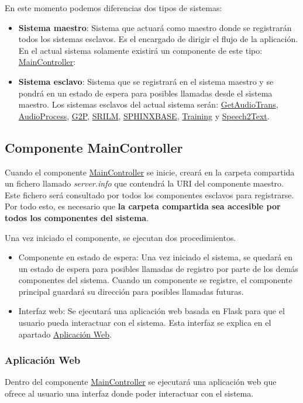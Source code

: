 \documentclass[../main.tex]{subfiles}
\begin{document}
En este momento podemos diferencias dos tipos de sistemas:
\begin{itemize}
    \item \textbf{Sistema maestro}: Sistema que actuará como maestro donde se registrarán todos los sistemas esclavos. Es el encargado de dirigir el flujo de la aplicación. En el actual sistema solamente existirá un componente de este tipo: \hyperref[par:maincontroller]{MainController}: 
    \item \textbf{Sistema esclavo}: Sistema que se registrará en el sistema maestro y se pondrá en un estado de espera para posibles llamadas desde el sistema maestro. Los sistemas esclavos del actual sistema serán: \hyperref[par:getaudiotrans]{GetAudioTrans}, \hyperref[par:audioprocess]{AudioProcess}, \hyperref[par:g2p]{G2P}, \hyperref[par:srilm]{SRILM}, \hyperref[par:sphinxbase]{SPHINXBASE}, \hyperref[par:training]{Training} y \hyperref[par:speech2text]{Speech2Text}.
\end{itemize}

\subsection{Componente MainController}\label{subsec:impl_maincontroller}
Cuando el componente \hyperref[par:maincontroller]{MainController} se inicie, creará en la carpeta compartida un fichero llamado \textit{server.info} que contendrá la URI del componente maestro. Este fichero será consultado por todos los componentes esclavos para registrarse. Por todo esto, es necesario que \textbf{la carpeta compartida sea accesible por todos los componentes del sistema}.

Una vez iniciado el componente, se ejecutan dos procedimientos.
\begin{itemize}
    \item Componente en estado de espera: Una vez iniciado el sistema, se quedará en un estado de espera para posibles llamadas de registro por parte de los demás componentes del sistema. Cuando un componente se registre, el componente principal guardará su dirección para posibles llamadas futuras.
    \item Interfaz web: Se ejecutará una aplicación web basada en Flask para que el usuario pueda interactuar con el sistema. Esta interfaz se explica en el apartado \hyperref[subsubsec:aplicacionweb]{Aplicación Web}.
\end{itemize}

\subsubsection{Aplicación Web}\label{subsubsec:aplicacionweb}
Dentro del componente \hyperref[par:maincontroller]{MainController} se ejecutará una aplicación web que ofrece al usuario una interfaz donde poder interactuar con el sistema.
\end{document}

